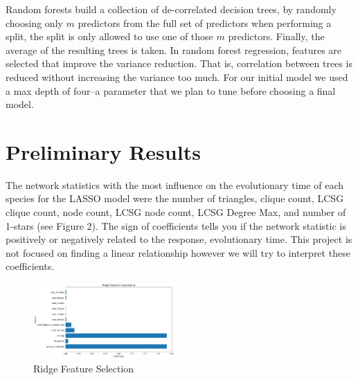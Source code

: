 \documentclass[12pt]{article}
\begin{document}
Random forests build a collection of de-correlated decision trees, by randomly choosing only $m$ predictors from the full set of predictors when performing a split, the split is only allowed to use one of those $m$ predictors. Finally, the average of the resulting trees is taken. In random forest regression, features are selected that improve the variance reduction. That is, correlation between trees is reduced without increasing the variance too much. For our initial model we used a max depth of four--a parameter that we plan to tune before choosing a final model.

\section{Preliminary Results}
The network statistics with the most influence on the evolutionary time of each species for the LASSO model were the number of triangles, clique count, LCSG clique count, node count, LCSG node count, LCSG Degree Max, and number of 1-stars (see Figure 2). The sign of coefficients tells you if the network statistic is positively or negatively related to the response, evolutionary time. This project is not focused on finding a linear relationship however we will try to interpret these coefficients.
\begin{figure}
  \vspace{-20pt}
  \begin{center}
    \includegraphics[width=0.48\textwidth]{PPIN_fig3}
  \end{center}
  \vspace{-20pt}
  \caption{Ridge Feature Selection}
  \vspace{-10pt}
\end{figure}
\end{document}
